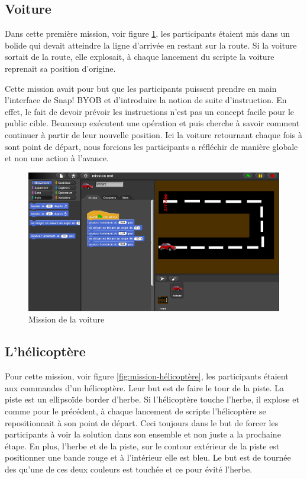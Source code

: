 \subsection{Voiture}
\label{mission-voiture}
Dans cette première mission, voir figure \ref{fig:mission-voiture}, les participants étaient mis dans un bolide qui devait atteindre la ligne d'arrivée en restant sur la route. Si la voiture sortait de la route, elle explosait, à chaque lancement du scripte la voiture reprenait sa position d'origine.

Cette mission avait pour but que les participants puissent prendre en main l'interface de Snap! BYOB et d'introduire la notion de suite d'instruction. En effet, le fait de devoir prévoir les instructions n'est pas un concept facile pour le public cible. Beaucoup exécutent une opération et puis cherche à savoir comment continuer à partir de leur nouvelle position. Ici la voiture retournant chaque fois à sont point de départ, nous forcions les participants a réfléchir de manière globale et non une action à l'avance.

\begin{figure}[ht]
  \begin{center}
    \includegraphics[scale=0.35]{content/7-solution/1-missions/images/voiture}
    \caption{Mission de la voiture}
    \label{fig:mission-voiture}
  \end{center}
\end{figure}


\subsection{L'hélicoptère}
\label{mission-helicoptere}
Pour cette mission, voir figure \ref{fig:mission-hélicoptère}, les participants étaient aux commandes d'un hélicoptère. Leur but est de faire le tour de la piste. La piste est un ellipsoïde border d'herbe. Si l'hélicoptère touche l'herbe, il explose et comme pour le précédent, à chaque lancement de scripte l'hélicoptère se repositionnait à son point de départ. Ceci toujours dans le but de forcer les participants à voir la solution dans son ensemble et non juste a la prochaine étape. En plus, l'herbe et de la piste, sur le contour extérieur de la piste est positionner une bande rouge et à l'intérieur elle est bleu. Le but est de tournée des qu'une de ces deux couleurs est touchée et ce pour évité l'herbe.\\

